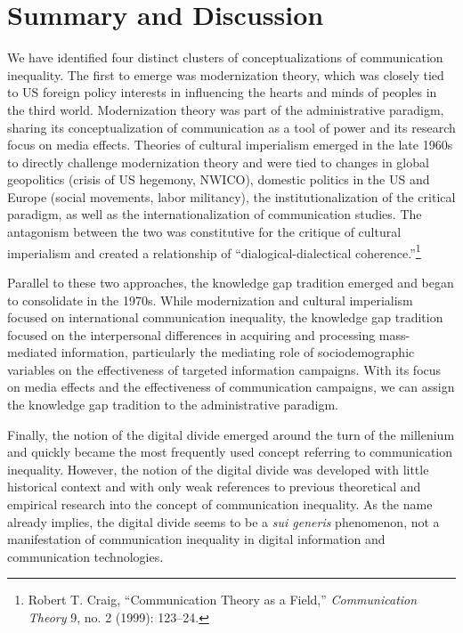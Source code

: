 \documentclass{tufte-handout}
\begin{document}
\hypertarget{summary-and-discussion}{%
\section{Summary and Discussion}\label{summary-and-discussion}}

We have identified four distinct clusters of conceptualizations of
communication inequality. The first to emerge was modernization theory,
which was closely tied to US foreign policy interests in influencing the
hearts and minds of peoples in the third world. Modernization theory was
part of the administrative paradigm, sharing its conceptualization of
communication as a tool of power and its research focus on media
effects. Theories of cultural imperialism emerged in the late 1960s to
directly challenge modernization theory and were tied to changes in
global geopolitics (crisis of US hegemony, NWICO), domestic politics in
the US and Europe (social movements, labor militancy), the
institutionalization of the critical paradigm, as well as the
internationalization of communication studies. The antagonism between
the two was constitutive for the critique of cultural imperialism and
created a relationship of ``dialogical-dialectical
coherence.''\footnote{Robert T. Craig, ``Communication Theory as a
  Field,'' \emph{Communication Theory} 9, no. 2 (1999): 123--24.}

Parallel to these two approaches, the knowledge gap tradition emerged
and began to consolidate in the 1970s. While modernization and cultural
imperialism focused on international communication inequality, the
knowledge gap tradition focused on the interpersonal differences in
acquiring and processing mass-mediated information, particularly the
mediating role of sociodemographic variables on the effectiveness of
targeted information campaigns. With its focus on media effects and the
effectiveness of communication campaigns, we can assign the knowledge
gap tradition to the administrative paradigm.

Finally, the notion of the digital divide emerged around the turn of the
millenium and quickly became the most frequently used concept referring
to communication inequality. However, the notion of the digital divide
was developed with little historical context and with only weak
references to previous theoretical and empirical research into the
concept of communication inequality. As the name already implies, the
digital divide seems to be a \emph{sui generis} phenomenon, not a
manifestation of communication inequality in digital information and
communication technologies.
\end{document}
